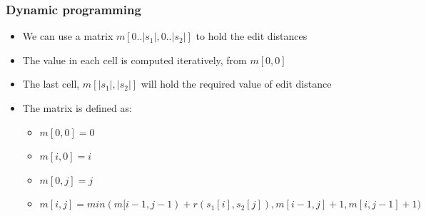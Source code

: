 \documentclass[svgnames]{beamer}
\begin{document}
\begin{frame} \frametitle{Dynamic programming}
  
  \begin{itemize}
  \item We can use a matrix $m[0..|s_1|,0..|s_2|]$ to hold the edit distances
  \item The value in each cell is computed iteratively, from $m[0,0]$
  \item The last cell, $m[|s_1|,|s_2|]$ will hold the required value of edit
    distance
  \end{itemize}

  \begin{block}{}
    \begin{itemize}
    \item The matrix is defined as:
      \begin{itemize}
      \item $m[0,0] = 0$
      \item $m[i,0] = i$
      \item $m[0,j] = j$
      \item $m[i,j] = min(m[i-1,j-1)+r(s_1[i],s_2[j]), m[i-1,j]+1, m[i,j-1]+1)$
      \end{itemize}
    \end{itemize}
  \end{block}

\end{frame}

\end{document}
